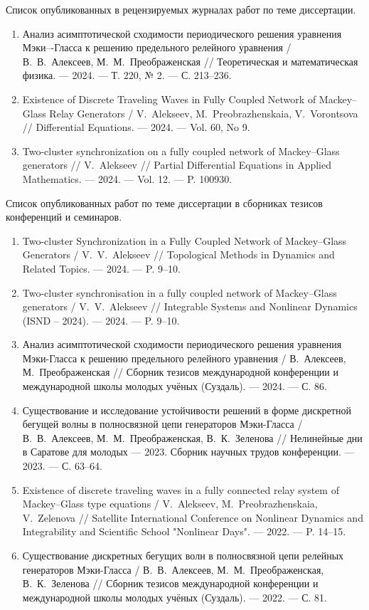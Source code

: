 Список опубликованных в рецензируемых журналах работ по теме диссертации.
\begin{enumerate}
	\item Анализ асимптотической сходимости периодического решения уравнения Мэки–-Гласса к решению предельного релейного уравнения / В.~В.~Алексеев, М.~М.~Преображенская // Теоретическая и математическая физика. --- 2024. --- Т. 220, № 2. --- С. 213--236. \cite{wosbib1}
	\item Existence of Discrete Traveling Waves in Fully Coupled Network of Mackey--Glass Relay Generators / V.~Alekseev, M.~Preobrazhenskaia, V.~Vorontsova // Differential Equations. --- 2024. --- Vol. 60, No 9. \cite{wosbib2}
	\item Two-cluster synchronization on a fully coupled network of Mackey--Glass generators // V.~Alekseev // Partial Differential Equations in Applied Mathematics. --- 2024. --- Vol. 12. --- P. 100930. \cite{scbib1}
\end{enumerate}

\medskip

Список опубликованных работ по теме диссертации в сборниках тезисов конференций и семинаров.
\begin{enumerate}
	\item Two-cluster Synchronization in a Fully Coupled Network of	Mackey--Glass Generators / V.~V.~Alekseev // Topological Methods in Dynamics and Related Topics. --- 2024. --- P. 9--10. \cite{confbib6}
	\item Two-cluster synchronisation in a fully coupled network of	Mackey--Glass generators / V.~V.~Alekseev // Integrable Systems and Nonlinear Dynamics (ISND -- 2024). --- 2024. --- P. 9--10. \cite{confbib5}
	\item Анализ асимптотической сходимости периодического решения уравнения Мэки-Гласса к решению предельного релейного уравнения	/ В.~Алексеев, М.~Преображенская // Сборник тезисов международной конференции и международной школы молодых учёных (Суздаль). --- 2024. --- С. 86. \cite{confbib3}
	\item Существование и исследование устойчивости решений в форме дискретной бегущей волны в полносвязной цепи генераторов	Мэки-Гласса / В.~В.~Алексеев, М.~М.~Преображенская, В.~К.~Зеленова // Нелинейные дни в Саратове для молодых --- 2023. Сборник научных трудов конференции. --- 2023. --- С. 63--64. \cite{confbib2}
	\item Existence of discrete traveling waves in a fully connected relay system of Mackey–Glass type equations / V.~Alekseev, M.~Preobrazhenskaia, V.~Zelenova // Satellite International Conference on Nonlinear Dynamics and Integrability and Scientific School "Nonlinear Days". --- 2022. --- P. 14--15. \cite{confbib4}
	\item Существование дискретных бегущих волн в полносвязной цепи релейных генераторов Мэки-Гласса / В.~В.~Алексеев, М.~М.~Преображенская, В.~К.~Зеленова // Сборник тезисов международной конференции и международной школы молодых учёных (Суздаль). --- 2022. --- С. 81. \cite{confbib1}
\end{enumerate}

